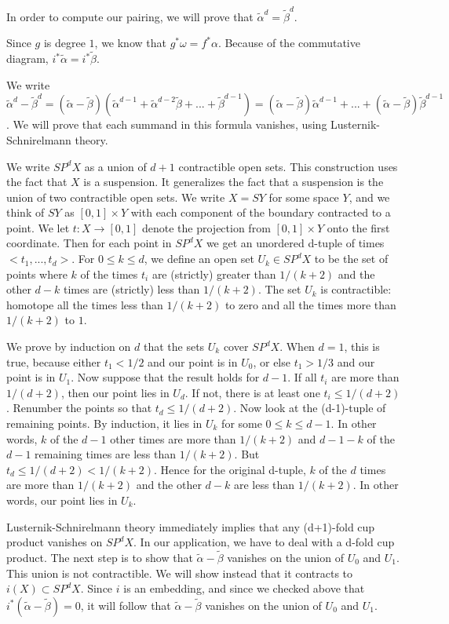\documentclass{amsart}
\newtheorem*{Theorem 1}{Theorem 1}
\newtheorem*{Theorem 2}{Theorem 2}
\newtheorem*{Theorem 1A}{Theorem 1A}
\newtheorem*{Theorem 2A}{Theorem 2A}
\newtheorem*{vanishing lemma}{Vanishing Lemma}
\numberwithin{equation}{section}
\begin{document}
In order to compute our pairing, we will prove that $\tilde \alpha ^d = \tilde \beta ^d$.

Since $g$ is degree $1$, we know that $g^* \omega =f^* \alpha$.  
Because of the commutative diagram, $i^* \tilde \alpha = i^* \tilde \beta$.

We write $\tilde \alpha^d - \tilde \beta^d = (\tilde \alpha -
\tilde \beta) (\tilde \alpha^{d-1} + \tilde \alpha^{d-2} \tilde
\beta + ... + \tilde \beta^{d-1}) = (\tilde \alpha-\tilde \beta)
\tilde \alpha^{d-1} + ... + (\tilde \alpha-\tilde \beta)
 \tilde \beta^{d-1}$.  We will prove
that each summand in this formula vanishes, using Lusternik-Schnirelmann 
theory.

We write $SP^d X$ as a union of $d+1$ contractible open sets.  This construction
uses the fact that $X$ is a suspension.  It generalizes the fact that a suspension
is the union of two contractible open sets.  We write $X = SY$ for some space
$Y$, and we think of $SY$ as $[0,1] \times Y$ with each component of the
boundary contracted to a point.  We let $t: X \rightarrow [0,1]$ denote the
projection from $[0,1] \times Y$ onto the first coordinate.  Then for each
point in $SP^d X$ we get an unordered d-tuple of times $<t_1, ..., t_d>$.
For $0 \le k \le d$, we define an open set $U_k \in SP^d X$ to be the set
of points where $k$ of the times $t_i$ are (strictly) greater than $1/(k+2)$ and
the other $d-k$ times are (strictly) less than $1/(k+2)$.  The set $U_k$
is contractible: homotope all the times less than $1/(k+2)$ to zero and all the times
more than $1/(k+2)$ to $1$.  

We prove by induction on $d$ that the sets $U_k$ cover $SP^d X$.  When $d=1$, this is true,
because either $t_1 < 1/2$ and our point is in $U_0$, or else $t_1 > 1/3$ and our point is in $U_1$.  
Now suppose that the result holds for
$d-1$.  If all $t_i$ are more than $1/(d+2)$, then our point lies in $U_d$.  If
not, there is at least one $t_i \le 1/(d+2)$.  Renumber the points so 
that $t_d \le 1/(d+2)$.  Now look at the 
(d-1)-tuple of remaining points.  By induction,
it lies in $U_k$ for some $0 \le k \le d-1$.  In other words, $k$ of the $d-1$
other times are more than $1/(k+2)$ and $d-1-k$ of the $d-1$ remaining times
are less than $1/(k+2)$.  But $t_d \le 1/(d+2) < 1/(k+2)$.  Hence for the original
d-tuple, $k$ of the $d$ times are more than $1/(k+2)$ and the other $d-k$ are less
than $1/(k+2)$.  In other words, our point lies in $U_k$.

Lusternik-Schnirelmann theory immediately implies that any (d+1)-fold cup product
vanishes on $SP^d X$.  In our application, we have to deal with a d-fold cup
product.  The next step is to show that $\tilde \alpha - \tilde \beta$ vanishes
on the union of $U_0$ and $U_1$.  This union is not contractible.  We will show
instead that it contracts to $i(X) \subset SP^d X$.  Since $i$ is an embedding,
and since we checked above that $i^*(\tilde \alpha - \tilde \beta) = 0$, it
will follow that $\tilde \alpha - \tilde \beta$ vanishes on the union of $U_0$
and $U_1$.
\end{document}
